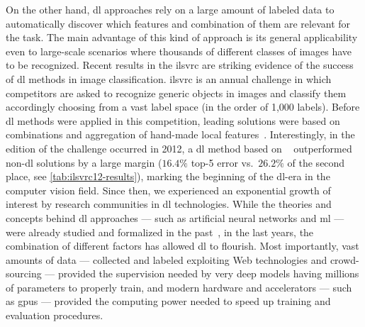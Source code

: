 On the other hand, \acrlong{dl} approaches rely on a large amount of labeled data to automatically discover which features and combination of them are relevant for the task.
The main advantage of this kind of approach is its general applicability even to large-scale scenarios where thousands of different classes of images have to be recognized.
Recent results in the \gls{ilsvrc} are striking evidence of the success of \gls{dl} methods in image classification.
\gls{ilsvrc} is an annual challenge in which competitors are asked to recognize generic objects in images and classify them accordingly choosing from a vast label space (in the order of 1,000 labels).
Before \gls{dl} methods were applied in this competition, leading solutions were based on combinations and aggregation of hand-made local features~\cite{harada2012graphical,akata2014good,sanchez2011high,mensink2012metric}.
Interestingly, in the edition of the challenge occurred in 2012, a \gls{dl} method based on ~\cite{krizhevsky2012imagenet} outperformed non-\gls{dl} solutions by a large margin ($16.4 \%$ top-5 error vs.\ $26.2 \%$ of the second place, see \ref{tab:ilsvrc12-results}), marking the beginning of the \gls{dl}-era in the computer vision field.
Since then, we experienced an exponential growth of interest by research communities in \gls{dl} technologies.
While the theories and concepts behind \gls{dl} approaches --- such as artificial neural networks and \acrlong{ml} --- were already studied and formalized in the past~\cite{rosenblatt1958perceptron,rumelhart1985learning,lecun1989backpropagation,widrow199030}, in the last years, the combination of different factors has allowed \acrlong{dl} to flourish.
Most importantly, vast amounts of data --- collected and labeled exploiting Web technologies and crowd-sourcing --- provided the supervision needed by very deep models having millions of parameters to properly train, and modern hardware and accelerators --- such as \glspl{gpu} --- provided the computing power needed to speed up training and evaluation procedures.

